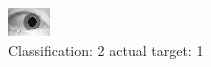 \begin{figure}[h!]
\begin{center}
\includegraphics[width=0.60\columnwidth]{figures/ID1523_class_2_target_1.png}
\end{center}
\caption{ Classification: 2 actual target: 1}
\label{fig:ID1523_class_2_target_1}
\end{figure}
